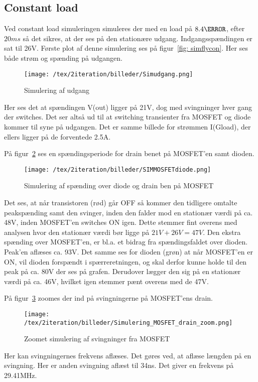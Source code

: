 \subsection{Constant load} \label{constant}
Ved constant load simuleringen simuleres  der med en load på $8.4\ohm$, efter $20ms$ så det sikres, at der ses på den stationære udgang. Indgangsspændingen er sat til 26V.
Første plot af denne simulering ses på figur~\ref{fig: simflycon}. Her ses både strøm og spænding på udgangen.
\begin{figure}[H]
	\center
	\texttt{[image: /tex/2iteration/billeder/Simudgang.png]}
	\caption{Simulering af udgang}
	\label{fig: simudgang}
\end{figure}
Her ses det at spændingen V(out) ligger på 21V, dog med svingninger hver gang der switches. Det ser altså ud til at switching transienter fra MOSFET og diode kommer til syne på udgangen. Det er samme billede for strømmen I(Gload), der ellers ligger på de forventede 2.5A.

\noindent På figur~\ref{fig: simMOSdio} ses en spændingsperiode for drain benet på MOSFET'en samt dioden. 
\begin{figure}[H]
	\center
	\texttt{[image: /tex/2iteration/billeder/SIMMOSFETdiode.png]}
	\caption{Simulering af spænding over diode og drain ben på MOSFET}
	\label{fig: simMOSdio}
\end{figure}
Det ses, at når transistoren (rød) går OFF så kommer den tidligere omtalte peakspænding samt den svinger, inden den falder mod en stationær værdi på ca. 48V, inden MOSFET'en switches ON igen. Dette stemmer fint overens med analysen hvor den stationær værdi bør ligge på $21V+26V=47V$. Den ekstra spænding over MOSFET'en, er bl.a. et bidrag fra spændingsfaldet over dioden.
Peak'en aflæses ca. 93V.
Det samme ses for dioden (grøn) at når MOSFET'en er ON, vil dioden forspændt i spærreretningen, og skal derfor kunne holde til den peak på ca. 80V der ses på grafen. Derudover lægger den sig på en stationær værdi på ca. 46V, hvilket igen stemmer pænt overens med de 47V. 

\noindent På figur~\ref{fig: simMOSzoom} zoomes der ind på svingningerne på MOSFET'ens drain.
\begin{figure}[H]
	\center
	\texttt{[image: /tex/2iteration/billeder/Simulering\_MOSFET\_drain\_zoom.png]}
	\caption{Zoomet simulering af svingninger fra MOSFET}
	\label{fig: simMOSzoom}
\end{figure}
Her kan svingningernes frekvens aflæses. Det gøres ved, at aflæse længden på en svingning. Her er anden svingning aflæst til 34ns. Det giver en frekvens på 29.41MHz.

